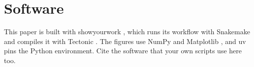 \documentclass[11pt]{article}
\begin{document}
\begin{table}[h]
  \centering
  \caption{Mean squared displacement at three steps.}
  \label{tab:results}
\end{table}

\section*{Software}

This paper is built with showyourwork \citep{Luger2021}, which runs its
workflow with Snakemake \citep{Molder2021} and compiles it with Tectonic
\citep{Tectonic}. The figures use NumPy \citep{Harris2020} and Matplotlib
\citep{Hunter2007}, and uv \citep{uv} pins the Python environment. Cite the
software that your own scripts use here too.


\end{document}
